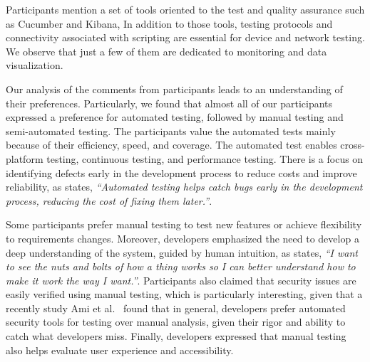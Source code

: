 Participants mention a set of tools oriented to the test and quality assurance such as Cucumber and Kibana, In addition to those tools, testing \iot protocols and connectivity associated with scripting are essential for device and network testing. We observe that just a few of them are dedicated to monitoring and data visualization.

Our analysis of the comments from participants leads to an understanding of their preferences. 
Particularly, we found that almost all of our participants expressed a preference for automated testing, followed by manual testing and semi-automated testing. 
The participants value the automated tests mainly because of their efficiency, speed, and coverage. The automated test enables cross-platform testing, continuous testing, and performance testing. There is a focus on identifying defects early in the development process to reduce costs and improve reliability, as  states, \textit{``Automated testing helps catch bugs early in the development process, reducing the cost of fixing them later.''}. %

 \label{find:results3}


Some participants prefer manual testing to test new features or achieve flexibility to requirements changes. 
Moreover, developers emphasized the need to develop a deep understanding of the system, guided by human intuition, \eg as  states, \textit{``I want to see the nuts and bolts of how a thing works so I can better understand how to make it work the way I want.''}.
Participants also claimed that security issues are easily verified using manual testing, which is particularly interesting,  given that a recently study Ami et al.~\cite{ampn24} found that in general, developers prefer automated security tools for testing over manual analysis, given their rigor and ability to catch what developers miss. %
Finally, developers expressed that manual testing also helps evaluate user experience and accessibility.

\label{find:results4}

